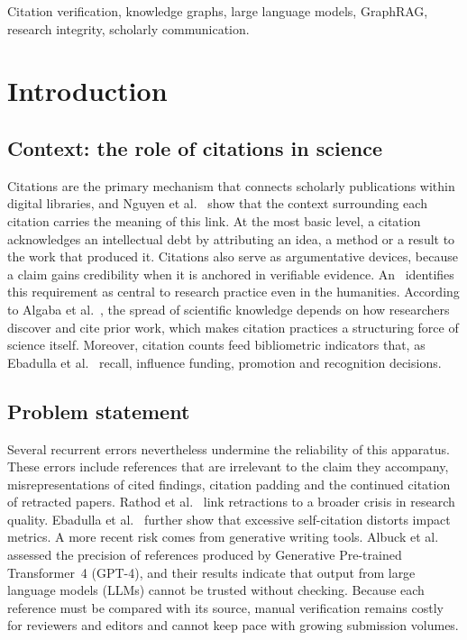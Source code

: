 \documentclass[lettersize,journal]{IEEEtran}
\begin{document}
\begin{IEEEkeywords}
Citation verification, knowledge graphs, large language models, GraphRAG, research integrity, scholarly communication.
\end{IEEEkeywords}

\section{Introduction}

\subsection{Context: the role of citations in science}

Citations are the primary mechanism that connects scholarly publications within digital libraries, and Nguyen et al.~\cite{nguyen2026deepening} show that the context surrounding each citation carries the meaning of this link. At the most basic level, a citation acknowledges an intellectual debt by attributing an idea, a method or a result to the work that produced it. Citations also serve as argumentative devices, because a claim gains credibility when it is anchored in verifiable evidence. An~\cite{an2026evidence} identifies this requirement as central to research practice even in the humanities. According to Algaba et al.~\cite{algaba2026how}, the spread of scientific knowledge depends on how researchers discover and cite prior work, which makes citation practices a structuring force of science itself. Moreover, citation counts feed bibliometric indicators that, as Ebadulla et al.~\cite{ebadulla2025detecting} recall, influence funding, promotion and recognition decisions.

\subsection{Problem statement}

Several recurrent errors nevertheless undermine the reliability of this apparatus. These errors include references that are irrelevant to the claim they accompany, misrepresentations of cited findings, citation padding and the continued citation of retracted papers. Rathod et al.~\cite{rathod2025beyond} link retractions to a broader crisis in research quality. Ebadulla et al.~\cite{ebadulla2025detecting} further show that excessive self-citation distorts impact metrics. A more recent risk comes from generative writing tools. Albuck et al.~\cite{albuck2024precision} assessed the precision of references produced by Generative Pre-trained Transformer~4 (GPT-4), and their results indicate that output from large language models (LLMs) cannot be trusted without checking. Because each reference must be compared with its source, manual verification remains costly for reviewers and editors and cannot keep pace with growing submission volumes.
\end{document}
